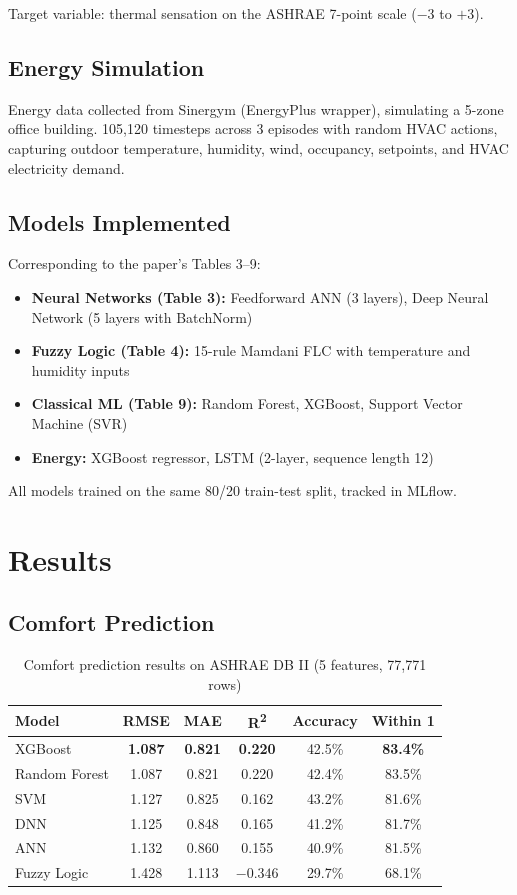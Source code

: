 \documentclass[11pt,a4paper]{article}
\begin{document}
Target variable: thermal sensation on the ASHRAE 7-point scale ($-3$ to $+3$).

\subsection{Energy Simulation}
Energy data collected from Sinergym \cite{sinergym} (EnergyPlus wrapper), simulating a 5-zone office building. 105,120 timesteps across 3 episodes with random HVAC actions, capturing outdoor temperature, humidity, wind, occupancy, setpoints, and HVAC electricity demand.

\subsection{Models Implemented}

Corresponding to the paper's Tables 3--9:
\begin{itemize}
    \item \textbf{Neural Networks (Table 3):} Feedforward ANN (3 layers), Deep Neural Network (5 layers with BatchNorm)
    \item \textbf{Fuzzy Logic (Table 4):} 15-rule Mamdani FLC with temperature and humidity inputs
    \item \textbf{Classical ML (Table 9):} Random Forest, XGBoost, Support Vector Machine (SVR)
    \item \textbf{Energy:} XGBoost regressor, LSTM (2-layer, sequence length 12)
\end{itemize}

All models trained on the same 80/20 train-test split, tracked in MLflow.

\section{Results}

\subsection{Comfort Prediction}

\begin{table}[H]
\centering
\caption{Comfort prediction results on ASHRAE DB II (5 features, 77,771 rows)}
\label{tab:comfort5}
\begin{tabular}{lccccc}
\toprule
Model & RMSE & MAE & R\textsuperscript{2} & Accuracy & Within 1 \\
\midrule
XGBoost & \textbf{1.087} & \textbf{0.821} & \textbf{0.220} & 42.5\% & \textbf{83.4\%} \\
Random Forest & 1.087 & 0.821 & 0.220 & 42.4\% & 83.5\% \\
SVM & 1.127 & 0.825 & 0.162 & 43.2\% & 81.6\% \\
DNN & 1.125 & 0.848 & 0.165 & 41.2\% & 81.7\% \\
ANN & 1.132 & 0.860 & 0.155 & 40.9\% & 81.5\% \\
Fuzzy Logic & 1.428 & 1.113 & $-0.346$ & 29.7\% & 68.1\% \\
\bottomrule
\end{tabular}
\end{table}
\end{document}
